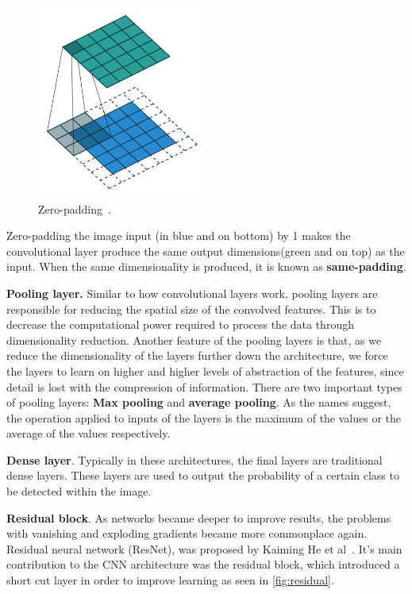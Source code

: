 \documentclass[oneside, english, bibtex]{kththesis}
\begin{document}
\begin{figure}[H]
  \begin{center}
    \includegraphics[width=0.5\textwidth]{figures/padding.png}
  \end{center}
  \caption{Zero-padding~\cite{Kang2020DeepCN}.}
  \label{fig:padding}
\end{figure}

\begin{center}
Zero-padding the image input (in blue and on bottom) by 1 makes the convolutional layer produce the same output dimensions(green and on top) as the input. When the same dimensionality is produced, it is known as \textbf{same-padding}.
\end{center}

\textbf{Pooling layer.} Similar to how convolutional layers work, pooling layers are responsible for reducing the spatial size of the convolved features. This is to decrease the computational power required to process the data through dimensionality reduction. Another feature of the pooling layers is that, as we reduce the dimensionality of the layers further down the architecture, we force the layers to learn on higher and higher levels of abstraction of the features, since detail is lost with the compression of information. There are two important types of pooling layers: \textbf{Max pooling} and \textbf{average pooling}. As the names suggest, the operation applied to inputs of the layers is the maximum of the values or the average of the values respectively.

\textbf{Dense layer}. Typically in these architectures, the final layers are traditional dense layers. These layers are used to output the probability of a certain class to be detected within the image.

\textbf{Residual block}. As networks became deeper to improve results, the problems with vanishing and exploding gradients became more commonplace again. Residual neural network (ResNet), was proposed by Kaiming He et al~\cite{he2016deep}. It’s main contribution to the CNN architecture was the residual block, which introduced a short cut layer in order to improve learning as seen in \autoref{fig:residual}.
\end{document}
